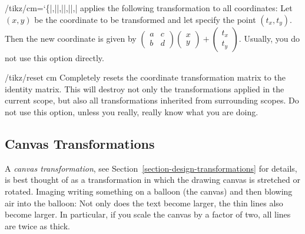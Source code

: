 \begin{key}{/tikz/cm={\ttfamily\char`\{}|,||,||,||,|}
    applies the following transformation to all coordinates: Let $(x,y)$ be the
    coordinate to be transformed and let  specify the point
    $(t_x,t_y)$. Then the new coordinate is given by
    $\left(\begin{smallmatrix} a & c \\ b & d\end{smallmatrix}\right)
    \left(\begin{smallmatrix} x \\ y \end{smallmatrix}\right) +
    \left(\begin{smallmatrix} t_x \\ t_y \end{smallmatrix}\right)$.
    Usually, you do not use this option directly.
\begin{codeexample}[]
\end{codeexample}
\end{key}

\begin{key}{/tikz/reset cm}
    Completely resets the coordinate transformation matrix to the identity
    matrix. This will destroy not only the transformations applied in the
    current scope, but also all transformations inherited from surrounding
    scopes. Do not use this option, unless you really, really know what you are
    doing.
\end{key}


\subsection{Canvas Transformations}

A \emph{canvas transformation}, see
Section~\ref{section-design-transformations} for details, is best thought of as
a transformation in which the drawing canvas is stretched or rotated. Imaging
writing something on a balloon (the canvas) and then blowing air into the
balloon: Not only does the text become larger, the thin lines also become
larger. In particular, if you scale the canvas by a factor of two, all lines
are twice as thick.

